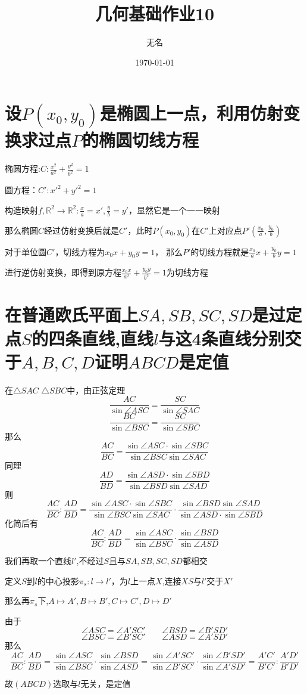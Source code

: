 \documentclass[12pt]{ctexart}
\title{几何基础作业10}
\author{无名}
\date{\today}
\begin{document}
\maketitle

\section{设$P(x_0,y_0)$是椭圆上一点，利用仿射变换求过点$P$的椭圆切线方程}

椭圆方程:$C:\frac{x^2}{a^2}+\frac{y^2}{b^2}=1$

圆方程：$C':x'^2+y'^2=1$

构造映射$f,\mathbb{R}^2 \to \mathbb{R}^2: \frac{x}{a}=x',\frac{y}{b}=y'$，显然它是一个一一映射

那么椭圆$C$经过仿射变换后就是$C'$，此时$P(x_0,y_0)$在$C'$上对应点$P'(\frac{x_0}{a},\frac{y_0}{b})$

对于单位圆$C'$，切线方程为$x_0x+y_0y=1$，
那么$P'$的切线方程就是$\frac{x_0}{a}x+\frac{y_0}{b}y=1$

进行逆仿射变换，即得到原方程$\frac{x_0x}{a^2}+\frac{y_0y}{b^2}=1$为切线方程

\section{在普通欧氏平面上$SA,SB,SC,SD$是过定点$S$的四条直线,直线$l$与这4条直线分别交于$A,B,C,D$证明$ABCD$是定值}

在$\bigtriangleup SAC$ $\bigtriangleup SBC$中，由正弦定理
\[\frac{AC}{\sin \angle ASC}=\frac{SC}{\sin \angle SAC}
\]
\[\frac{BC}{\sin \angle BSC}=\frac{SC}{\sin \angle SBC}
\]
那么
\[\frac{AC}{BC}=\frac{\sin \angle ASC\cdot \sin \angle SBC}{\sin \angle BSC \sin \angle SAC}
\]
同理
\[\frac{AD}{BD}=\frac{\sin \angle ASD\cdot \sin \angle SBD}{\sin \angle BSD \sin \angle SAD}
\]
则
\[\frac{AC}{BC}:\frac{AD}{BD}=\frac{\sin \angle ASC\cdot \sin \angle SBC}{\sin \angle BSC \sin \angle SAC}\cdot \frac{\sin \angle BSD \sin \angle SAD}{\sin \angle ASD\cdot \sin \angle SBD}
\]
化简后有
\[\frac{AC}{BC}:\frac{AD}{BD}=\frac{\sin \angle ASC}{\sin \angle BSC }\cdot \frac{\sin \angle BSD }{\sin \angle ASD}
\]

我们再取一个直线$l'$,不经过$S$且与$SA,SB,SC,SD$都相交

定义$S$到$l$的中心投影$\pi_s:l\rightarrow l'$，为$l$上一点$X$,连接$XS$与$l'$交于$X'$

那么再$\pi_s$下,$A\mapsto A',B\mapsto B',C \mapsto C',D \mapsto D'$

由于
\[\angle ASC=\angle A'SC' \hspace{2em}\angle BSD=\angle B'SD'
\]
\[\angle BSC=\angle B'SC' \hspace{2em}\angle ASD=\angle A'SD'
\]
那么
\[\frac{AC}{BC}:\frac{AD}{BD}=\frac{\sin \angle ASC}{\sin \angle BSC }\cdot \frac{\sin \angle BSD }{\sin \angle ASD}=\frac{\sin \angle A'SC'}{\sin \angle B'SC' }\cdot \frac{\sin \angle B'SD' }{\sin \angle A'SD'}=\frac{A'C'}{B'C'}:\frac{A'D'}{B'D'}
\]

故$(ABCD)$选取与$l$无关，是定值
\end{document}
